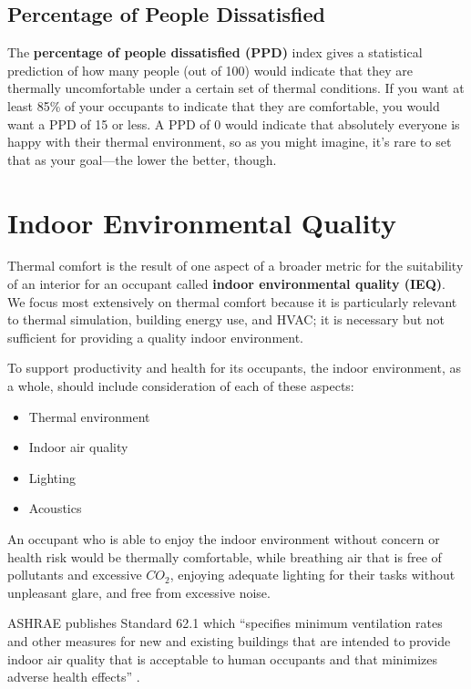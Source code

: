 \documentclass[10pt]{article}
\begin{document}
\subsection{Percentage of People Dissatisfied}

The \textbf{percentage of people dissatisfied (PPD)} index gives a statistical prediction of how many people (out of 100) would indicate that they are thermally uncomfortable under a certain set of thermal conditions. If you want at least 85\% of your occupants to indicate that they are comfortable, you would want a PPD of 15 or less. A PPD of 0 would indicate that absolutely everyone is happy with their thermal environment, so as you might imagine, it's rare to set that as your goal---the lower the better, though.

\section{Indoor Environmental Quality}

Thermal comfort is the result of one aspect of a broader metric for the suitability of an interior for an occupant called \textbf{indoor environmental quality (IEQ)}. We focus most extensively on thermal comfort because it is particularly relevant to thermal simulation, building energy use, and HVAC; it is necessary but not sufficient for providing a quality indoor environment.

To support productivity and health for its occupants, the indoor environment, as a whole, should include consideration of each of these aspects:

\vspace{-6pt}
\begin{itemize}
    \setlength{\itemsep}{0pt}%
    \setlength{\parskip}{0pt}%
    \item Thermal environment
    \item Indoor air quality
    \item Lighting
    \item Acoustics
\end{itemize}
\vspace{-6pt}

An occupant who is able to enjoy the indoor environment without concern or health risk would be thermally comfortable, while breathing air that is free of pollutants and excessive $CO_2$, enjoying adequate lighting for their tasks without unpleasant glare, and free from excessive noise.

ASHRAE publishes Standard 62.1 which ``specifies minimum ventilation rates and other measures for new and existing
buildings that are intended to provide indoor air quality that is acceptable to human occupants and that minimizes adverse health effects'' \cite{noauthor_undated-st}.
\end{document}

